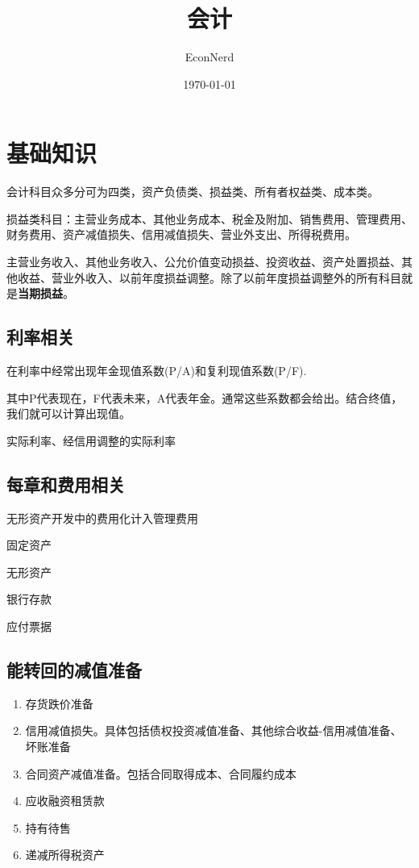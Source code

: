 \documentclass[UTF8,12pt]{ctexart}
\title{会计} %
\author{EconNerd}
\date{\today}
\newenvironment{Dr}{%
	\begin{list}{}%
		{
			\setlength{\leftmargin}{2em}
			\setlength{\labelwidth}{2em}
			\setlength{\labelsep}{0pt}
			\setlength{\itemindent}{0pt}
			\setlength{\listparindent}{0pt}
			\setlength{\parsep}{0pt}
			\setlength{\topsep}{0pt}
		}
		\item[\textbf{借：}]
	}{%
	\end{list}
}
\newenvironment{Cr}{%
	\begin{list}{}%
		{
			\setlength{\leftmargin}{3em}
			\setlength{\labelwidth}{2em}
			\setlength{\labelsep}{0pt}
			\setlength{\itemindent}{0pt}
			\setlength{\listparindent}{0pt}
			\setlength{\parsep}{0pt}
			\setlength{\topsep}{0pt}
		}
		\item[\textbf{贷：}]
	}{%
	\end{list}
}
\numberwithin{equation}{section} %
\numberwithin{figure}{section}
\numberwithin{table}{section}
\begin{document}
	\maketitle
	\tableofcontents
	\newpage
	
	\section{基础知识}
	
	会计科目众多分可为四类，资产负债类、损益类、所有者权益类、成本类。
	
	损益类科目：主营业务成本、其他业务成本、税金及附加、销售费用、管理费用、财务费用、资产减值损失、信用减值损失、营业外支出、所得税费用。
	
	主营业务收入、其他业务收入、公允价值变动损益、投资收益、资产处置损益、其他收益、营业外收入、以前年度损益调整。除了以前年度损益调整外的所有科目就是\textbf{当期损益}。
	
	\subsection{利率相关}
	在利率中经常出现年金现值系数(P/A)和复利现值系数(P/F).
	
	其中P代表现在，F代表未来，A代表年金。通常这些系数都会给出。结合终值，我们就可以计算出现值。
	
	实际利率、经信用调整的实际利率
	
	\subsection{每章和费用相关}
	无形资产开发中的费用化计入管理费用

	\begin{Dr}
		固定资产 \par
		无形资产
	\end{Dr}
	\begin{Cr}
		银行存款
		
		应付票据
	\end{Cr}

	\subsection{能转回的减值准备}
	\begin{enumerate}
		\item 存货跌价准备
		
		\item 信用减值损失。具体包括债权投资减值准备、其他综合收益-信用减值准备、坏账准备
		
		\item 合同资产减值准备。包括合同取得成本、合同履约成本
		
		\item 应收融资租赁款
		
		\item 持有待售
		
		\item 递减所得税资产
	\end{enumerate}
	
\end{document}
